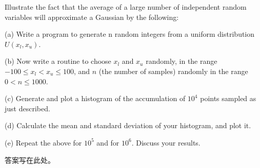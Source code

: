 \documentclass{hw}
\begin{document}
\begin{computerexercise}
Illustrate the fact that the average of a large number of independent random variables will approximate a Gaussian by the following:

(a) Write a program to generate n random integers from a uniform distribution \(U(x_l, x_u)\).

(b) Now write a routine to choose \(x_l\) and \(x_u\) randomly, in the range \(-100 \leq x_l < x_u \leq 100\), and \(n\) (the number of samples) randomly in the range \(0 < n \leq 1000\).

(c) Generate and plot a histogram of the accumulation of \(10^4\) points sampled as just described.

(d) Calculate the mean and standard deviation of your histogram, and plot it.

(e) Repeat the above for \(10^5\) and for \(10^6\). Discuss your results.
\end{computerexercise}

\begin{answer}
答案写在此处。
\end{answer}
\end{document}
